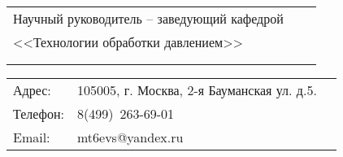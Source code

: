\begin{center}
\begin{tabular}[c]{l m{3cm} r}
	
	Научный руководитель -- заведующий кафедрой &  			 &					\\
	    <<Технологии обработки давлением>>      &  			 &					\\
	          \supervisorRegaliaShort           &            & \supervisorFioShort \\
	                                            & \hrulefill &
\end{tabular}
\end{center}

\begin{flushleft}
\begin{tabular}{l@{~}l@{~}l}
	Адрес:   & 105005, г. Москва, 2-я Бауманская ул. д.5. &  \\
	Телефон: & 8(499)~263-69-01                           &  \\
	Email:   & mt6evs@yandex.ru                           &
\end{tabular}
\end{flushleft}

\clearpage
